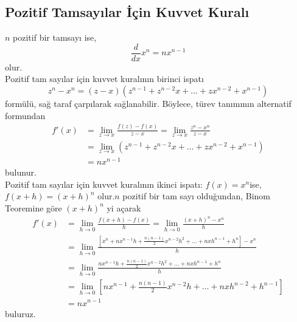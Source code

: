 \subsection{\protect Pozitif Tamsayılar İçin Kuvvet Kuralı}
$n$ pozitif bir tamsayı ise,
	\begin{equation*}
		\frac{d}{dx}x^n=nx^{n-1}
	\end{equation*}	
olur.\\
Pozitif tam sayılar için kuvvet kuralının birinci ispatı
	\begin{equation*}
		z^n-x^n = (z-x)(z^{n-1}+z^{n-2}x+...+zx^{n-2}+x^{n-1})
	\end{equation*}
formülü, sağ taraf çarpılarak sağlanabilir. Böylece, türev tanımının alternatif formundan
	\begin{equation*}
		\begin{split}
		f'(x) &= \lim_{z \rightarrow x}\frac{f(z)-f(x)}{z-x}=\lim_{z \rightarrow x}\frac{z^n-x^n}{z-x}\\
		&= \lim_{z \rightarrow x}(z^{n-1}+z^{n-2}x+...+zx^{n-2}+x^{n-1})\\
		&=nx^{n-1}
	\end{split}
		\end{equation*}
bulunur.\\
Pozitif tam sayılar için kuvvet kuralının ikinci ispatı: $f(x) = x^n$ise, $f(x+h)=(x+h)^n$ olur.$n$ pozitif bir tam sayı olduğundan, Binom Teoremine göre $(x+h)^n$ yi açarak
	\begin{equation*}
		\begin{split}
		f'(x) &= \lim_{h \rightarrow 0}\frac{f(x+h)-f(x)}{h}=\lim_{h \rightarrow 0}\frac{(x+h)^n-x^n}{h}\\
		&= \lim_{h \rightarrow 0}\frac{\left[x^n+nx^{n-1}h+\frac{n(n-1)}{2}x^{n-2}h^2+...+nxh^{n-1}+h^n\right]-x^n}{h}\\
		&= \lim_{h \rightarrow 0}\frac{nx^{n-1}h+\frac{n(n-1)}{2}x^{n-2}h^2+...+nxh^{n-1}+h^n}{h}\\
		&= \lim_{h \rightarrow 0}\left[nx^{n-1}+\frac{n(n-1)}{2}x^{n-2}h+...+nxh^{n-2}+h^{n-1}\right]\\
		&= nx^{n-1}
	\end{split}
		\end{equation*}
buluruz.
